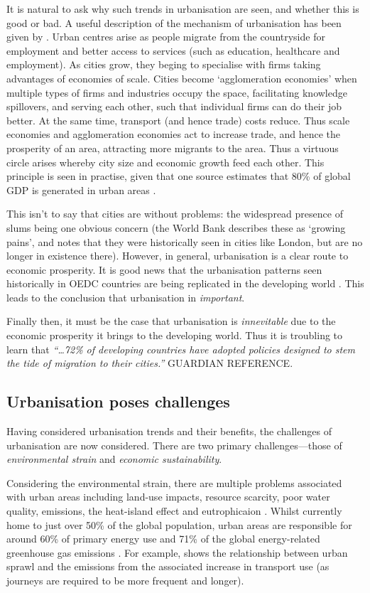 It is natural to ask why such trends in urbanisation are seen, and whether this is good or bad. A useful description of the mechanism of urbanisation has been given by \citet{WorldBank2008a}. Urban centres arise as people migrate from the countryside for employment and better access to services (such as education, healthcare and employment). As cities grow, they beging to specialise with firms taking advantages of economies of scale. Cities become `agglomeration economies' when multiple types of firms and industries occupy the space, facilitating knowledge spillovers, and serving each other, such that individual firms can do their job better. At the same time, transport (and hence trade) costs reduce. Thus scale economies and agglomeration economies act to increase trade, and hence the prosperity of an area, attracting more migrants to the area. Thus a virtuous circle arises whereby city size and economic growth feed each other. This principle is seen in practise, given that one source estimates that 80\% of global GDP is generated in urban areas \citep{AREAS2012}.

This isn't to say that cities are without problems: the widespread presence of slums being one obvious concern (the World Bank describes these as `growing pains', and notes that they were historically seen in cities like London, but are no longer in existence there). However, in general, urbanisation is a clear route to economic prosperity. It is good news that the urbanisation patterns seen historically in OEDC countries are being replicated in the developing world \citep{WorldBank2008a}. This leads to the conclusion that urbanisation in \emph{important}.

Finally then, it must be the case that urbanisation is \emph{innevitable} due to the economic prosperity it brings to the developing world. Thus it is troubling to learn that \emph{``\ldots 72\% of developing countries have adopted policies designed to stem the tide of migration to their cities.''} GUARDIAN REFERENCE.

\subsection{Urbanisation poses challenges}
Having considered urbanisation trends and their benefits, the challenges of urbanisation are now considered. There are two primary challenges---those of \emph{environmental strain} and \emph{economic sustainability}.

Considering the environmental strain, there are multiple problems associated with urban areas including land-use impacts, resource scarcity, poor water quality, emissions, the heat-island effect and eutrophicaion \citep{Cai2011}. Whilst currently home to just over 50\% of the global population, urban areas are responsible for around 60\% of primary energy use and 71\% of the global energy-related greenhouse gas emissions \citep{IEA2008}. For example, \citet{Grubler2009} shows the relationship between urban sprawl and the emissions from the associated increase in transport use (as journeys are required to be more frequent and longer).

